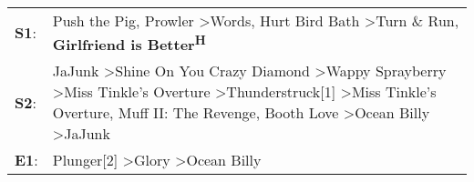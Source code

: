 \begin{supertabular}{p{0.03\textwidth}p{0.92\textwidth}}
 \textbf{S1}:  &                                                                                                                                                                                                                                                              Push the Pig\textsuperscript{}, \enspace Prowler\textsuperscript{} \textgreater \enspace Words\textsuperscript{}, \enspace Hurt Bird Bath\textsuperscript{} \textgreater \enspace Turn \& Run\textsuperscript{}, \enspace \textbf{Girlfriend is Better\textsuperscript{H}}  \enspace  \\
 \textbf{S2}:  &  JaJunk\textsuperscript{} \textgreater \enspace Shine On You Crazy Diamond\textsuperscript{} \textgreater \enspace Wappy Sprayberry\textsuperscript{} \textgreater \enspace Miss Tinkle's Overture\textsuperscript{} \textgreater \enspace Thunderstruck[1]\textsuperscript{} \textgreater \enspace Miss Tinkle's Overture\textsuperscript{}, \enspace Muff II: The Revenge\textsuperscript{}, \enspace Booth Love\textsuperscript{} \textgreater \enspace Ocean Billy\textsuperscript{} \textgreater \enspace JaJunk\textsuperscript{}  \enspace  \\
 \textbf{E1}:  &                                                                                                                                                                                                                                                                                                                                                                                                          Plunger[2]\textsuperscript{} \textgreater \enspace Glory\textsuperscript{} \textgreater \enspace Ocean Billy\textsuperscript{}  \enspace  \\
\end{supertabular}
